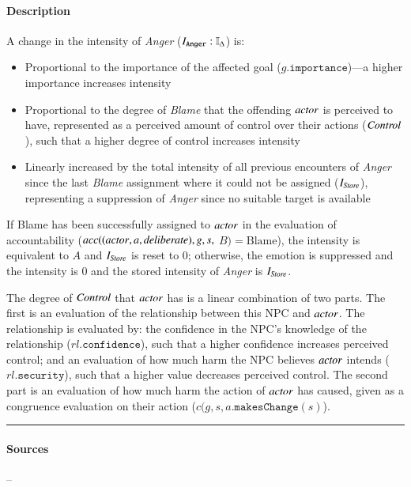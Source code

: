 \paragraph{Description} A change in the intensity of \textit{Anger}
($I_{\mathtt{Anger}} : \mathbb{I}_{\Delta}$) is:
\begin{itemize}
    \item Proportional to the importance of the affected goal
    ($g.\mathtt{importance}$)---a higher importance increases intensity

    \item Proportional to the degree of \textit{Blame} that the offending
    $\mathit{actor}$ is perceived to have, represented as a perceived amount of
    control over their actions ($\mathit{Control}$), such that a higher degree of
    control increases intensity

    \item Linearly increased by the total intensity of all previous encounters
    of \textit{Anger} since the last \textit{Blame} assignment where it could
    not be assigned ($I_{\mathit{Store}}$), representing a suppression of
    \textit{Anger} since no suitable target is available
\end{itemize}

If Blame has been successfully assigned to $\mathit{actor}$ in the evaluation of
accountability ($acc((\mathit{actor}, a,\allowbreak \mathit{deliberate}), g, s,$ $B) = 
\text{Blame}$), the intensity is equivalent to $A$ and $I_{\mathit{Store}}$ is reset 
to $0$; otherwise, the emotion is suppressed and the intensity is $0$ and the 
stored intensity of \textit{Anger} is $I_{\mathit{Store}}$.

The degree of $\mathit{Control}$ that $\mathit{actor}$ has is a linear combination of two
parts. The first is an evaluation of the relationship between this NPC and
$\mathit{actor}$. The relationship is evaluated by: the confidence in the NPC's
knowledge of the relationship ($rl.\mathtt{confidence}$), such that a higher
confidence increases perceived control; and an evaluation of how much harm the
NPC believes $\mathit{actor}$ intends ($rl.\mathtt{security}$), such that a higher
value decreases perceived control. The second part is an evaluation of how much
harm the action of $\mathit{actor}$ has caused, given as a congruence evaluation on
their action ($c(g, s, a.\mathtt{makesChange}(s)$). \\\hrule

\paragraph{Sources} --

